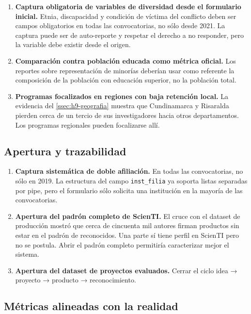\documentclass[11pt,a4paper,oneside]{article}
\begin{document}
\begin{enumerate}[label=B.\arabic*., leftmargin=*]
\item \textbf{Captura obligatoria de variables de diversidad desde el formulario inicial.} Etnia, discapacidad y condición de víctima del conflicto deben ser campos obligatorios en todas las convocatorias, no sólo desde 2021. La captura puede ser de auto-reporte y respetar el derecho a no responder, pero la variable debe existir desde el origen.
\item \textbf{Comparación contra población educada como métrica oficial.} Los reportes sobre representación de minorías deberían usar como referente la composición de la población con educación superior, no la población total.
\item \textbf{Programas focalizados en regiones con baja retención local.} La evidencia del \ref{ssec:h9-geografia} muestra que Cundinamarca y Risaralda pierden cerca de un tercio de sus investigadores hacia otros departamentos. Los programas regionales pueden focalizarse allí.
\end{enumerate}

\subsection{Apertura y trazabilidad}

\begin{enumerate}[label=C.\arabic*., leftmargin=*]
\item \textbf{Captura sistemática de doble afiliación.} En todas las convocatorias, no sólo en 2019. La estructura del campo \texttt{inst\_filia} ya soporta listas separadas por pipe, pero el formulario sólo solicita una institución en la mayoría de las convocatorias.
\item \textbf{Apertura del padrón completo de ScienTI.} El cruce con el dataset de producción mostró que cerca de cincuenta mil autores firman productos sin estar en el padrón de reconocidos. Una parte sí tiene perfil en ScienTI pero no se postula. Abrir el padrón completo permitiría caracterizar mejor el sistema.
\item \textbf{Apertura del dataset de proyectos evaluados.} Cerrar el ciclo idea → proyecto → producto → reconocimiento.
\end{enumerate}

\subsection{Métricas alineadas con la realidad}
\end{document}
